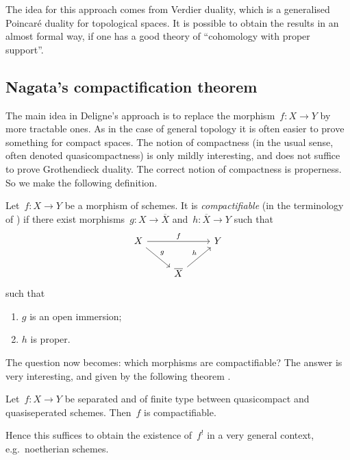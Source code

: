 \documentclass[10pt,a4paper]{article}
\begin{document}
The idea for this approach comes from Verdier duality, which is a generalised Poincar\'e duality for topological spaces. It is possible to obtain the results in an almost formal way, if one has a good theory of ``cohomology with proper support''.

\subsection{Nagata's compactification theorem}
The main idea in Deligne's approach is to replace the morphism~$f\colon X\to Y$ by more tractable ones. As in the case of general topology it is often easier to prove something for compact spaces. The notion of compactness (in the usual sense, often denoted quasicompactness) is only mildly interesting, and does not suffice to prove Grothendieck duality. The correct notion of compactness is properness. So we make the following definition.
\begin{definition}
  Let~$f\colon X\to Y$ be a morphism of schemes. It is \emph{compactifiable} (in the terminology of \cite[appendix]{hartshorne-residues-and-duality}) if there exist morphisms~$g\colon X\to\overline{X}$ and~$h\colon\overline{X}\to Y$ such that
  \begin{equation}
    \begin{tikzcd}
      X \arrow{rr}{f} \arrow{rd}{g} & & Y \\
      & \overline{X} \arrow{ur}{h}
    \end{tikzcd}
  \end{equation}
  such that
  \begin{enumerate}
    \item $g$ is an open immersion;
    \item $h$ is proper.
  \end{enumerate}
\end{definition}
The question now becomes: which morphisms are compactifiable? The answer is very interesting, and given by the following theorem \cite{nagata-imbedding,nagata-generalization-imbedding,conrad-delignes-notes-nagata-compactification}.
\begin{theorem}
  \label{theorem:nagata}
  Let~$f\colon X\to Y$ be separated and of finite type between quasicompact and quasiseperated schemes. Then~$f$ is compactifiable.
\end{theorem}
Hence this suffices to obtain the existence of~$f^!$ in a very general context, e.g.\ noetherian schemes.
\end{document}
